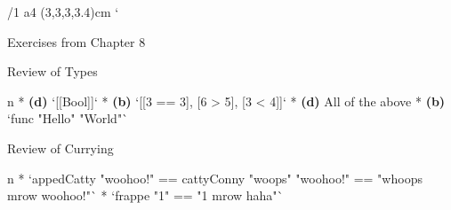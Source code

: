


\margins/1 a4 (3,3,3,3.4)cm
\typosize[9/10.5]
\parindent=10pt
\hyperlinks \Blue\Blue
\activettchar`
\def\inithook{\localcolor\Red}

\tit Exercises from Chapter 8

\sec Review of Types

\begitems \style n
* {\bf (d)} `[[Bool]]`
* {\bf (b)} `[[3 == 3], [6 > 5], [3 < 4]]`
* {\bf (d)} All of the above
* {\bf (b)} `func "Hello" "World"`
\enditems

\sec Review of Currying

\begitems \style n
* `appedCatty "woohoo!" == cattyConny "woops" "woohoo!" == "whoops mrow woohoo!"`
* `frappe "1" == "1 mrow haha"`
\enditems

\bye
